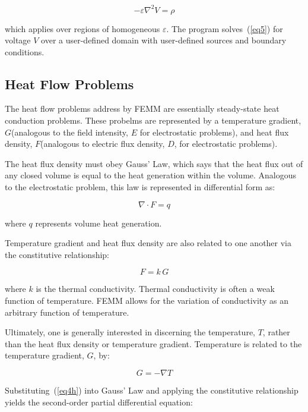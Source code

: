 \documentclass[12pt]{report}
\begin{document}
\begin{equation}
\label{eq5}
 - \varepsilon \nabla ^2V = \rho
\end{equation}

\noindent
which applies over regions of homogeneous \textit{$\varepsilon $}.
The program solves~(\ref{eq5}) for voltage $V$ over a user-defined
domain with user-defined sources and boundary conditions.

\subsection{Heat Flow Problems}

The heat flow problems address by FEMM are essentially steady-state
heat conduction problems. These probelms are represented by a
temperature gradient, $G$(analogous to the field intensity, $E$ for
electrostatic problems), and heat flux density, $F$(analogous to
electric flux density, $D$, for electrostatic problems).

The heat flux density must obey Gauss' Law, which says that the
heat flux out of any closed volume is equal to the heat generation
within the volume. Analogous to the electrostatic problem, this law
is represented in differential form as:

\begin{equation}
\label{eq1h}
\nabla \cdot F = q
\end{equation}

\noindent
where $q$ represents volume heat generation.

\noindent
Temperature gradient and heat flux density are also related to one
another via the constitutive relationship:

\begin{equation}
\label{eq3h}
F = k\,G
\end{equation}

\noindent
where $k$ is the thermal conductivity. Thermal conductivity is
often a weak function of temperature. FEMM allows for the variation
of conductivity as an arbitrary function of temperature.

Ultimately, one is generally interested in discerning the
temperature, $T$, rather than the heat flux density or temperature
gradient. Temperature is related to the temperature gradient, $G$,
by:

\begin{equation}
\label{eq4h}
G = - \nabla T
\end{equation}

Substituting~(\ref{eq4h}) into Gauss' Law and applying the
constitutive relationship yields the second-order partial
differential equation:
\end{document}
